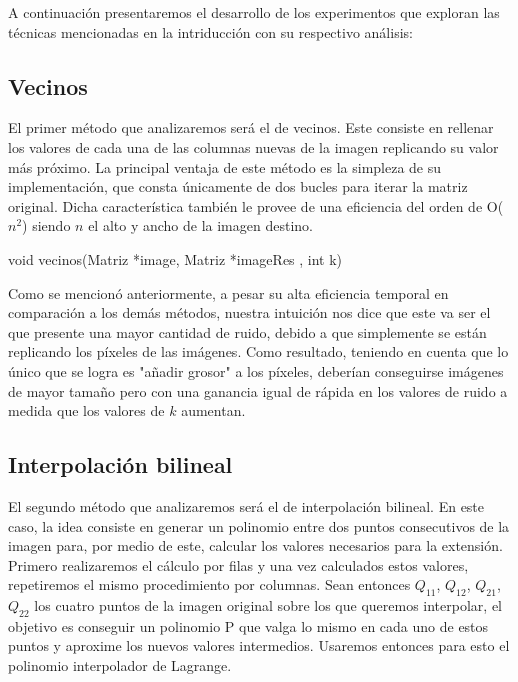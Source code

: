 A continuación presentaremos el desarrollo de los experimentos que exploran las técnicas mencionadas en la intriducción con su respectivo análisis:

\subsection{Vecinos}
El primer método que analizaremos será el de vecinos. Este consiste en rellenar los valores de cada una de las columnas
nuevas de la imagen replicando su valor más próximo. La principal ventaja de este método es la simpleza de su implementación, que consta únicamente de dos bucles para iterar la matriz original. Dicha característica también le provee de una eficiencia del orden de O($n^2$) siendo $n$ el alto y ancho de la imagen destino.

\begin{algorithm}
\begin{algorithmic}[1]\parskip=1mm
\caption{void vecinos(Matriz *image, Matriz *imageRes , int k)}
    \ENDFOR
\ENDFOR
\end{algorithmic}
\end{algorithm}

Como se mencionó anteriormente, a pesar su alta eficiencia temporal en comparación a los demás métodos, nuestra intuición nos dice que este va ser el que presente una mayor cantidad de ruido, debido a que simplemente se están replicando los píxeles de las imágenes. Como resultado, teniendo en cuenta que lo único que se logra es "añadir grosor" a los píxeles, deberían conseguirse imágenes de mayor tamaño pero con una ganancia igual de rápida en los valores de ruido a medida que los valores de $k$ aumentan.

\subsection{Interpolación bilineal}
El segundo método que analizaremos será el de interpolación bilineal. En este caso, la idea consiste en generar un polinomio entre
dos puntos consecutivos de la imagen para, por medio de este, calcular los valores necesarios para la extensión. \\
Primero realizaremos el cálculo por filas y una vez calculados estos valores, repetiremos el mismo procedimiento por columnas.
Sean entonces $Q_{11}$, $Q_{12}$, $Q_{21}$, $Q_{22}$ los cuatro puntos de la imagen original sobre los que queremos interpolar, el objetivo es conseguir un polinomio P que valga lo mismo en cada uno de estos puntos y aproxime los nuevos valores intermedios. Usaremos entonces para esto el polinomio interpolador de Lagrange.

